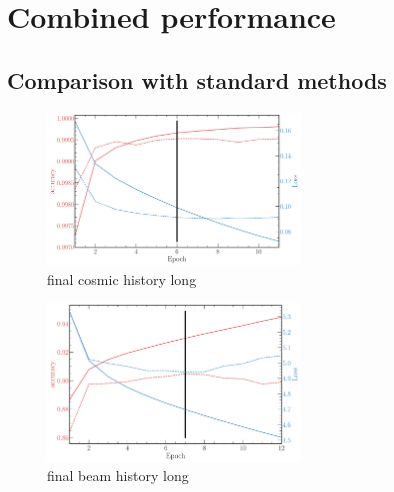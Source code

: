 \section{Combined performance} %
\label{sec:cvn_final} %

\subsection{Comparison with standard methods} %
\label{sec:cvn_final_comparison} %

\begin{figure} %
    \includegraphics[width=0.6\textwidth]{diagrams/7-cvn/chipsnet/final_cosmic_history.pdf}
    \caption[final cosmic history short]
    {final cosmic history long}
    \label{fig:final_cosmic_history}
\end{figure}

\begin{figure} %
    \includegraphics[width=0.6\textwidth]{diagrams/7-cvn/chipsnet/final_beam_history.pdf}
    \caption[final beam history short]
    {final beam history long}
    \label{fig:final_beam_history}
\end{figure}

